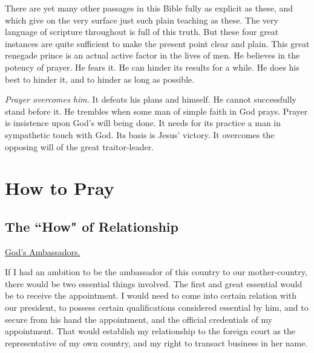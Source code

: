 There are yet many other passages in this Bible fully as explicit as
these, and which give on the very surface just such plain teaching as
these. The very language of scripture throughout is full of this truth.
But these four great instances are quite sufficient to make the present
point clear and plain. This great renegade prince is an actual active
factor in the lives of men. He believes in the potency of prayer. He fears
it. He can hinder its results for a while. He does his best to hinder it,
and to hinder as long as possible.

\textit{Prayer overcomes him.} It defeats his plans and himself. He cannot
successfully stand before it. He trembles when some man of simple faith in
God prays. Prayer is insistence upon God's will being done. It needs for
its practice a man in sympathetic touch with God. Its basis is Jesus'
victory. It overcomes the opposing will of the great traitor-leader.




\part{How to Pray}





\chapter{The ``How" of Relationship}



\underline{God's Ambassadors.}


If I had an ambition to be the ambassador of this country to our
mother-country, there would be two essential things involved. The first
and great essential would be to receive the appointment. I would need to
come into certain relation with our president, to possess certain
qualifications considered essential by him, and to secure from his hand
the appointment, and the official credentials of my appointment. That
would establish my relationship to the foreign court as the representative
of my own country, and my right to transact business in her name.

